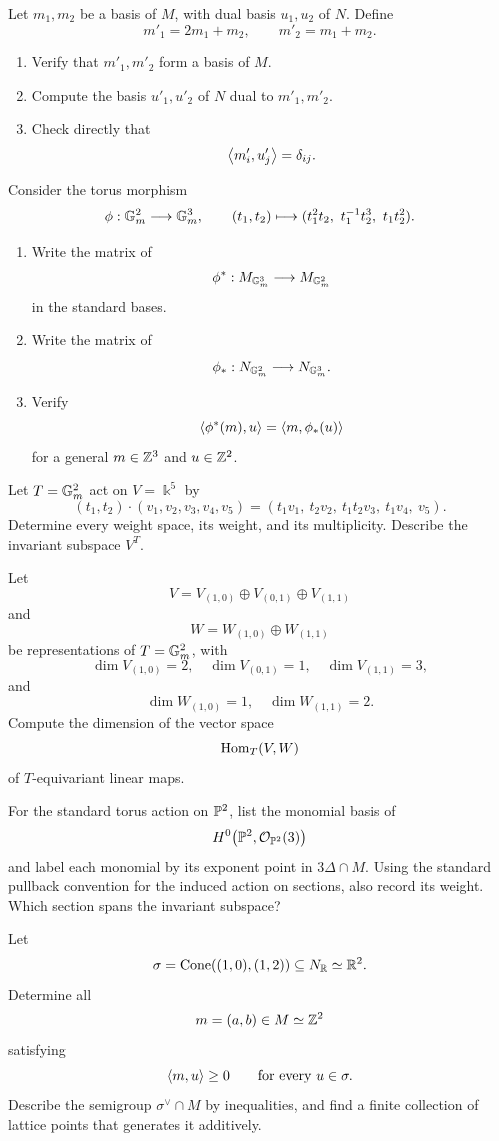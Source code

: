 \begin{exercises}
\item Let \(m_1,m_2\) be a basis of \(M\), with dual basis
\(u_1,u_2\) of \(N\). Define
\[
m'_1=2m_1+m_2,
\qquad
m'_2=m_1+m_2.
\]
\begin{enumerate}[label=(\alph*),wide=0pt]
\item Verify that \(m'_1,m'_2\) form a basis of \(M\).
\item Compute the basis \(u'_1,u'_2\) of \(N\) dual to
\(m'_1,m'_2\).
\item Check directly that
\[
\left\langle m'_i,u'_j\right\rangle=\delta_{ij}.
\]
\end{enumerate}

\item Consider the torus morphism
\[
\phi:\mathbb{G}_{m}^2\longrightarrow\mathbb{G}_{m}^3,
\qquad
(t_1,t_2)
\longmapsto
(t_1^2t_2,\ t_1^{-1}t_2^3,\ t_1t_2^2).
\]
\begin{enumerate}[label=(\alph*),wide=0pt]
\item Write the matrix of
\[
\phi^*:M_{\mathbb{G}_{m}^3}\longrightarrow M_{\mathbb{G}_{m}^2}
\]
in the standard bases.
\item Write the matrix of
\[
\phi_*:N_{\mathbb{G}_{m}^2}\longrightarrow N_{\mathbb{G}_{m}^3}.
\]
\item Verify
\[
\left\langle \phi^*(m),u\right\rangle
=
\left\langle m,\phi_*(u)\right\rangle
\]
for a general \(m\in\mathbb{Z}^3\) and \(u\in\mathbb{Z}^2\).
\end{enumerate}

\item Let \(T=\mathbb{G}_{m}^2\) act on \(V=\Bbbk^5\) by
\[
(t_1,t_2)\cdot
(v_1,v_2,v_3,v_4,v_5)
=
(t_1v_1,\ t_2v_2,\ t_1t_2v_3,\ t_1v_4,\ v_5).
\]
Determine every weight space, its weight, and its multiplicity.
Describe the invariant subspace \(V^T\).

\item Let
\[
V=V_{(1,0)}\oplus V_{(0,1)}\oplus V_{(1,1)}
\]
and
\[
W=W_{(1,0)}\oplus W_{(1,1)}
\]
be representations of \(T=\mathbb{G}_{m}^2\), with
\[
\dim V_{(1,0)}=2,\quad
\dim V_{(0,1)}=1,\quad
\dim V_{(1,1)}=3,
\]
and
\[
\dim W_{(1,0)}=1,\quad
\dim W_{(1,1)}=2.
\]
Compute the dimension of the vector space
\[
\operatorname{Hom}_T(V,W)
\]
of \(T\)-equivariant linear maps.

\item For the standard torus action on \(\mathbb{P}^2\), list the monomial
basis of
\[
H^0\bigl(\mathbb{P}^2,\mathcal{O}_{\mathbb{P}^2}(3)\bigr)
\]
and label each monomial by its exponent point in \(3\Delta\cap M\).
Using the standard pullback convention for the induced action on
sections, also record its weight. Which section spans the invariant
subspace?

\item Let
\[
\sigma
=
\operatorname{Cone}((1,0),(1,2))
\subseteq N_{\mathbb{R}}\simeq\mathbb{R}^2.
\]
Determine all
\[
m=(a,b)\in M\simeq\mathbb{Z}^2
\]
satisfying
\[
\left\langle m,u\right\rangle\geq0
\qquad
\text{for every }u\in\sigma.
\]
Describe the semigroup \(\sigma^\vee\cap M\) by inequalities, and find
a finite collection of lattice points that generates it additively.

\end{exercises}

